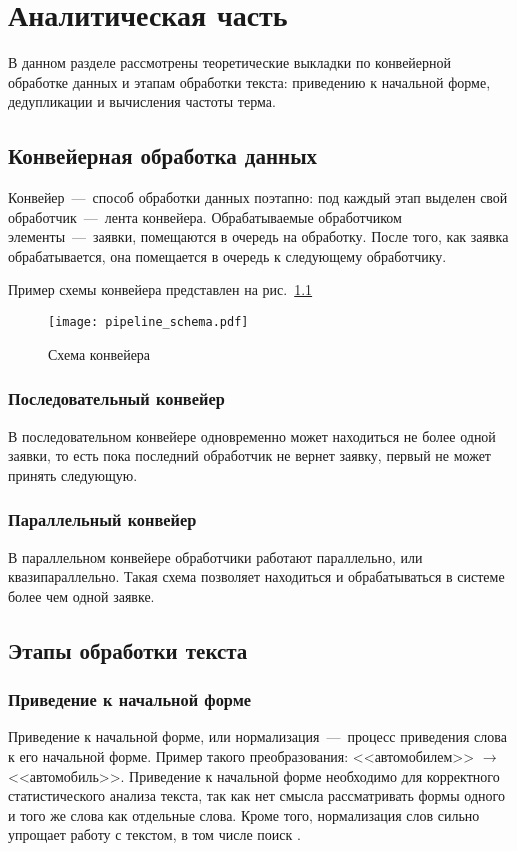 \chapter{Аналитическая часть}

В данном разделе рассмотрены теоретические выкладки по конвейерной обработке данных и этапам обработки текста: приведению к начальной форме, дедупликации и вычисления частоты терма.

\section{Конвейерная обработка данных}

Конвейер~---~способ обработки данных поэтапно: под каждый этап выделен свой обработчик~---~лента конвейера. Обрабатываемые обработчиком элементы~---~заявки, помещаются в очередь на обработку. После того, как заявка обрабатывается, она помещается в очередь к следующему обработчику.

Пример схемы конвейера представлен на рис.~\ref{img:pipeline_schema}

\begin{figure}[h!]
\centering
    \texttt{[image: pipeline\_schema.pdf]}
    \caption{Схема конвейера}
    \label{img:pipeline_schema}	
\end{figure}

\subsection{Последовательный конвейер}
В последовательном конвейере одновременно может находиться не более одной заявки, то есть пока последний обработчик не вернет заявку, первый не может принять следующую.

\subsection{Параллельный конвейер}
В параллельном конвейере обработчики работают параллельно, или квазипараллельно. Такая схема позволяет находиться и обрабатываться в системе более чем одной заявке.

\section{Этапы обработки текста}

\subsection{Приведение к начальной форме}
Приведение к начальной форме, или нормализация~---~процесс приведения слова к его начальной форме. Пример такого преобразования: <<автомобилем>> $\rightarrow$ <<автомобиль>>.
Приведение к начальной форме необходимо для корректного статистического анализа текста, так как нет смысла рассматривать формы одного и того же слова как отдельные слова. Кроме того, нормализация слов сильно упрощает работу с текстом, в том числе поиск \cite{bib:kazah}. 

